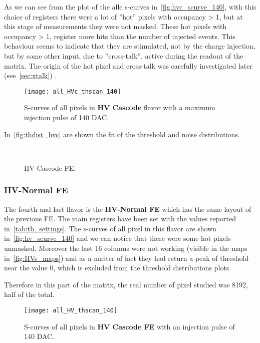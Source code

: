 As we can see from the plot of the alle s-curves in~\autoref{fig:hvc_scurve_140}, with this choice of registers there were a lot of ''hot'' pixels with occupancy > 1, but at this stage of measurements they were not masked.
These hot pixels with occupancy > 1, register more hits than the number of injected events. This behaviour seems to indicate that they are stimulated, not by the charge injection, but by some other input, due to ''cross-talk'', active during the readout of the matrix. The origin of the hot pixel and cross-talk was carefully investigated later (see~\autoref{sec:xtalk})
.

\begin{figure}[h!]
\centering
\texttt{[image: all\_HVc\_thscan\_140]}
\caption{S-curves of all pixels in \textbf{HV Cascode} flavor with a maximum injection pulse of 140 DAC.}
\label{fig:hvc_scurve_140}
\end{figure}

In~\autoref{fig:thdist_hvc} are shown the fit of the threshold and noise distributions.

\begin{figure}[h!]
\centering
{}\quad
{}\\
\caption{HV Cascode FE.}
\label{fig:thdist_hvc}
\end{figure}


\subsubsection{HV-Normal FE}\label{sec:first_xtalk}

The fourth and last flavor is the \textbf{HV-Normal FE} which has the same layout of the previous FE. The main registers have been set with the values reported in~\autoref{tab:tb_settings}.
The s-curves of all pixel in this flavor are shown in~\autoref{fig:hv_scurve_140} and we can notice that there were some hot pixels unmasked.
Moreover the last 16 columns were not working (visible in the maps in~\autoref{fig:HVs_maps}) and as a matter of fact they had return a peak of threshold near the value 0, which is excluded from the threshold distributions plots.

Therefore in this part of the matrix, the real number of pixel studied was 8192, half of the total.


\begin{figure}[h!]
\centering
\texttt{[image: all\_HV\_thscan\_140]}
\caption{S-curves of all pixels in \textbf{HV Cascode FE} with an injection pulse of 140 DAC.}
\label{fig:hv_scurve_140}
\end{figure}

